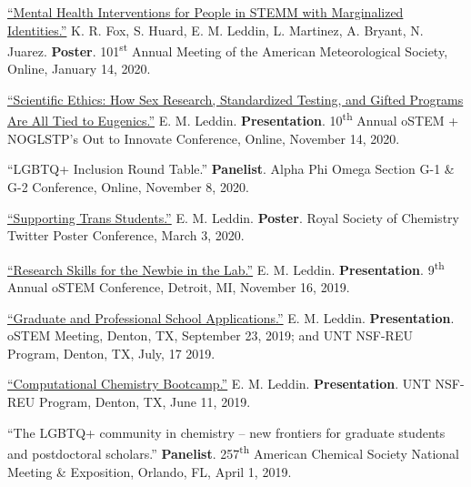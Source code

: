 \documentclass[letterpaper,11pt]{article}
\begin{document}
\begin{etaremune}[start=20]
  \item \textnormal{\href{https://bit.ly/2020-oSTEM-Ethics}{``Mental Health Interventions for People in STEMM with Marginalized Identities.''} K. R. Fox, S. Huard, E. M. Leddin, L. Martinez, A. Bryant, N. Juarez. \textbf{Poster}. 101\textsuperscript{st} Annual Meeting of the American Meteorological Society, Online, January 14, 2020.}
  \item \textnormal{\href{https://bit.ly/2020-oSTEM-Ethics}{``Scientific Ethics: How Sex Research, Standardized Testing, and Gifted Programs Are All Tied to Eugenics.''} E. M. Leddin. \textbf{Presentation}. 10\textsuperscript{th} Annual oSTEM + NOGLSTP's Out to Innovate\texttrademark{} Conference, Online, November 14, 2020.}
  \item \textnormal{``LGBTQ+ Inclusion Round Table.'' \textbf{Panelist}. Alpha Phi Omega Section G-1 \& G-2 Conference, Online, November 8, 2020.}
  \item \textnormal{\href{https://twitter.com/EmLedd1/status/1234812260515749889?s=20}{``Supporting Trans Students.''} E. M. Leddin. \textbf{Poster}. Royal Society of Chemistry Twitter Poster Conference, March 3, 2020.}
  \item \textnormal{\href{http://bit.ly/2019-oSTEM-PROF10}{``Research Skills for the Newbie in the Lab.''} E. M. Leddin. \textbf{Presentation}. 9\textsuperscript{th} Annual oSTEM Conference, Detroit, MI, November 16, 2019.}
\item \textnormal{\href{https://www.youtube.com/watch?v=6VkSUhsZr40&feature=youtu.be}{``Graduate and Professional School Applications.''} E. M. Leddin. \textbf{Presentation}. oSTEM Meeting, Denton, TX, September 23, 2019; and UNT NSF-REU Program, Denton, TX, July, 17 2019.}
  \item \textnormal{\href{http://bit.ly/2019-UNTREU-CCBC}{``Computational Chemistry Bootcamp.''} E. M. Leddin. \textbf{Presentation}. UNT NSF-REU Program, Denton, TX, June 11, 2019.}
  \item \textnormal{``The LGBTQ+ community in chemistry -- new frontiers for graduate students and postdoctoral scholars.'' \textbf{Panelist}. 257\textsuperscript{th} American Chemical Society National Meeting \& Exposition, Orlando, FL, April 1, 2019.}

\end{etaremune}
\newpage
\end{document}
